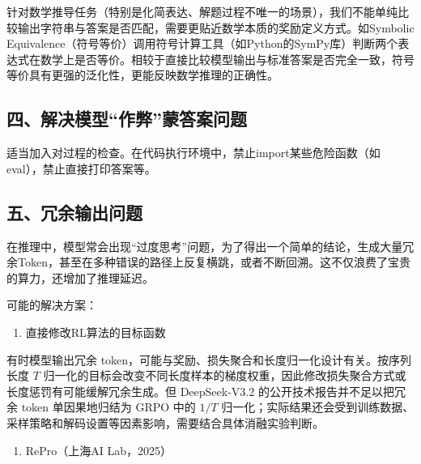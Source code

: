 针对数学推导任务（特别是化简表达、解题过程不唯一的场景），我们不能单纯比较输出字符串与答案是否匹配，需要更贴近数学本质的奖励定义方式。如Symbolic Equivalence（符号等价）调用符号计算工具（如Python的SymPy库）判断两个表达式在数学上是否等价。相较于直接比较模型输出与标准答案是否完全一致，符号等价具有更强的泛化性，更能反映数学推理的正确性。

\hypertarget{ux56dbux89e3ux51b3ux6a21ux578bux4f5cux5f0aux8499ux7b54ux6848ux95eeux9898}{%
\subsection{四、解决模型``作弊''蒙答案问题}\label{ux56dbux89e3ux51b3ux6a21ux578bux4f5cux5f0aux8499ux7b54ux6848ux95eeux9898}}

适当加入对过程的检查。在代码执行环境中，禁止import某些危险函数（如eval），禁止直接打印答案等。

\hypertarget{ux4e94ux5197ux4f59ux8f93ux51faux95eeux9898}{%
\subsection{五、冗余输出问题}\label{ux4e94ux5197ux4f59ux8f93ux51faux95eeux9898}}

在推理中，模型常会出现``过度思考''问题，为了得出一个简单的结论，生成大量冗余Token，甚至在多种错误的路径上反复横跳，或者不断回溯。这不仅浪费了宝贵的算力，还增加了推理延迟。

可能的解决方案：

\begin{enumerate}
\def\labelenumi{\arabic{enumi}.}
\tightlist
\item
  直接修改RL算法的目标函数
\end{enumerate}

有时模型输出冗余 token，可能与奖励、损失聚合和长度归一化设计有关。按序列长度 \(T\) 归一化的目标会改变不同长度样本的梯度权重，因此修改损失聚合方式或长度惩罚有可能缓解冗余生成。但 DeepSeek-V3.2 的公开技术报告并不足以把冗余 token 单因果地归结为 GRPO 中的 \(1/T\) 归一化；实际结果还会受到训练数据、采样策略和解码设置等因素影响，需要结合具体消融实验判断。

\begin{enumerate}
\def\labelenumi{\arabic{enumi}.}
\setcounter{enumi}{1}
\tightlist
\item
  RePro（上海AI Lab，2025）
\end{enumerate}


